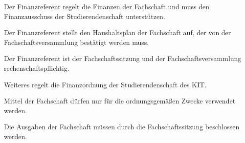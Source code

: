 \documentclass[a4paper, parskip=half, numbers=noenddot]{scrartcl}
\begin{document}
\begin{contract}
Der Finanzreferent regelt die Finanzen der Fachschaft und muss den Finanzausschuss der Studierendenschaft unterstützen.

Der Finanzreferent stellt den Haushaltsplan der Fachschaft auf, der von der Fachschaftsversammlung bestätigt werden muss.



Der Finanzreferent ist der Fachschaftssitzung und der Fachschaftsversammlung rechen\-schafts\-pflichtig.

Weiteres regelt die Finanzordnung der Studierendenschaft des KIT.

Mittel der Fachschaft dürfen nur für die ordnungsgemäßen Zwecke verwendet werden.

Die Ausgaben der Fachschaft müssen durch die Fachschaftssitzung beschlossen werden.


\end{contract}
\end{document}
